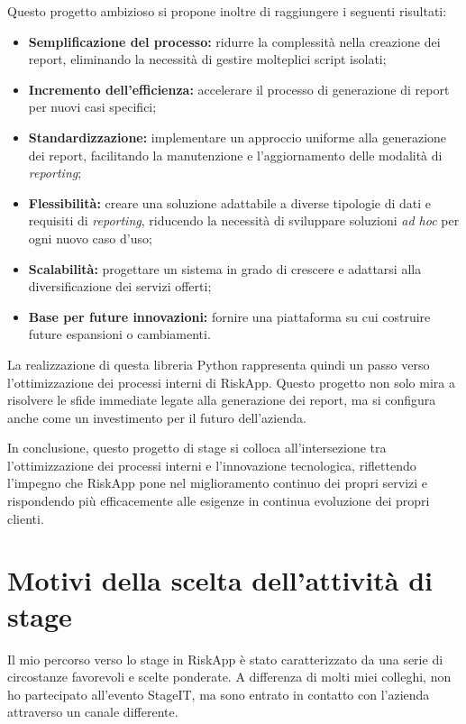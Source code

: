 Questo progetto ambizioso si propone inoltre di raggiungere i seguenti risultati:

\begin{itemize}
	\item \textbf{Semplificazione del processo:} ridurre la complessità nella creazione dei report, eliminando la necessità di gestire molteplici script isolati;
	\item \textbf{Incremento dell'efficienza:} accelerare il processo di generazione di report per nuovi casi specifici;
	\item \textbf{Standardizzazione:} implementare un approccio uniforme alla generazione dei report, facilitando la manutenzione e l'aggiornamento delle modalità di \textit{reporting};
	\item \textbf{Flessibilità:} creare una soluzione adattabile a diverse tipologie di dati e requisiti di \textit{reporting}, riducendo la necessità di sviluppare soluzioni \textit{ad hoc} per ogni nuovo caso d'uso;
	\item \textbf{Scalabilità:} progettare un sistema in grado di crescere e adattarsi alla diversificazione dei servizi offerti;
	\item \textbf{Base per future innovazioni:} fornire una piattaforma su cui costruire future espansioni o cambiamenti.
\end{itemize}

La realizzazione di questa libreria Python rappresenta quindi un passo verso l'ottimizzazione dei processi interni di RiskApp. Questo progetto non solo mira a risolvere le sfide immediate legate alla generazione dei report, ma si configura anche come un investimento per il futuro dell'azienda. 

In conclusione, questo progetto di stage si colloca all'intersezione tra l'ottimizzazione dei processi interni e l'innovazione tecnologica, riflettendo l'impegno che RiskApp pone nel miglioramento continuo dei propri servizi e rispondendo più efficacemente alle esigenze in continua evoluzione dei propri clienti.

\section{Motivi della scelta dell'attività di stage}
Il mio percorso verso lo stage in RiskApp è stato caratterizzato da una serie di circostanze favorevoli e scelte ponderate. A differenza di molti miei colleghi, non ho partecipato all'evento StageIT, ma sono entrato in contatto con l'azienda attraverso un canale differente.

